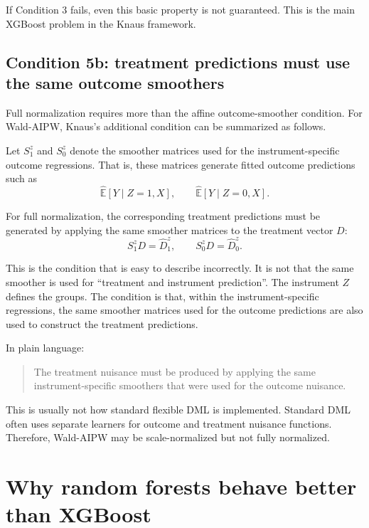 \documentclass[11pt,a4paper]{article}
\begin{document}
If Condition 3 fails, even this basic property is not guaranteed. This is the
main XGBoost problem in the Knaus framework.

\subsection{Condition 5b: treatment predictions must use the same outcome smoothers}

Full normalization requires more than the affine outcome-smoother condition. For
Wald-AIPW, Knaus's additional condition can be summarized as follows.

Let \(S^z_1\) and \(S^z_0\) denote the smoother matrices used for the
instrument-specific outcome regressions. That is, these matrices generate fitted
outcome predictions such as
\begin{equation}
    \widehat{\mathbb E}[Y\mid Z=1,X],
    \qquad
    \widehat{\mathbb E}[Y\mid Z=0,X].
\end{equation}

For full normalization, the corresponding treatment predictions must be generated
by applying the same smoother matrices to the treatment vector \(D\):
\begin{equation}
    S^z_1D = \hat D^z_1,
    \qquad
    S^z_0D = \hat D^z_0.
    \label{eq:c5b}
\end{equation}

This is the condition that is easy to describe incorrectly. It is not that the
same smoother is used for ``treatment and instrument prediction''. The instrument
\(Z\) defines the groups. The condition is that, within the instrument-specific
regressions, the same smoother matrices used for the outcome predictions are also
used to construct the treatment predictions.

In plain language:

\begin{quote}
The treatment nuisance must be produced by applying the same instrument-specific
smoothers that were used for the outcome nuisance.
\end{quote}

This is usually not how standard flexible DML is implemented. Standard DML often
uses separate learners for outcome and treatment nuisance functions. Therefore,
Wald-AIPW may be scale-normalized but not fully normalized.

\section{Why random forests behave better than XGBoost}
\end{document}
